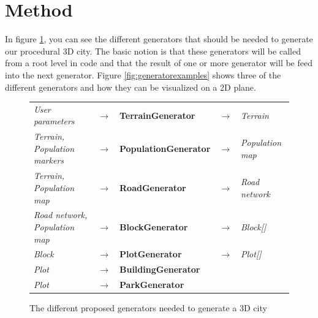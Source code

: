 \section{Method}
In figure \ref{fig:generators}, you can see the different generators that should be needed to generate our procedural 3D city. 
The basic notion is that these generators will be called from a root level in code and that the result of one or more generator will be feed into the next generator.
Figure \ref{fig:generatorexamples} shows three of the different generators and how they can be visualized on a 2D plane. 

\begin{center}
  \begin{figure}[H]
    \begin{center}
      \begin{table}[H]
        \begin{tabular}{lllll}
          \textit{User parameters}              & $\rightarrow$ & \textbf{TerrainGenerator}    & $\rightarrow$ & \textit{Terrain}        \\
          \textit{Terrain, Population markers}  & $\rightarrow$ & \textbf{PopulationGenerator} & $\rightarrow$ & \textit{Population map} \\
          \textit{Terrain, Population map}      & $\rightarrow$ & \textbf{RoadGenerator}       & $\rightarrow$ & \textit{Road network}   \\
          \textit{Road network, Population map} & $\rightarrow$ & \textbf{BlockGenerator}      & $\rightarrow$ & \textit{Block{[}{]}}    \\
          \textit{Block}                        & $\rightarrow$ & \textbf{PlotGenerator}       & $\rightarrow$ & \textit{Plot{[}{]}}     \\
          \textit{Plot}                         & $\rightarrow$ & \textbf{BuildingGenerator}   &               &                         \\
          \textit{Plot}                         & $\rightarrow$ & \textbf{ParkGenerator}       &               &                        
        \end{tabular}
      \end{table}
    \end{center}
    \caption[]{The different proposed generators needed to generate a 3D city}
    \label{fig:generators}
  \end{figure}
\end{center}

